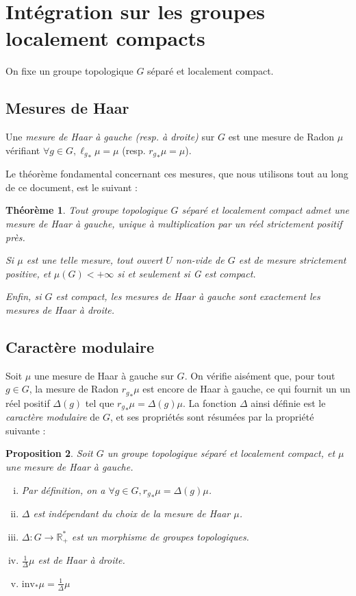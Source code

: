 \documentclass[a4paper,12pt]{article}
\newtheorem{theorem}{Théorème}[section]
\newtheorem{proposition}[theorem]{Proposition}
\newcommand{\R}{\mathbb{R}}
\newcommand{\ssi}{si et seulement si }
\newcommand{\invop}{\mathrm{inv}}
\begin{document}
\section{Intégration sur les groupes localement compacts}

On fixe un groupe topologique $G$ séparé et localement compact.

\subsection*{Mesures de Haar}

Une \emph{mesure de Haar à gauche (resp. à droite)} sur $G$
est une mesure de Radon $\mu$ vérifiant $\forall g\in G, {\ell_g}_*\mu = \mu$ (resp. ${r_g}_*\mu = \mu$).

Le théorème fondamental concernant ces mesures, que nous utilisons tout au long de ce document, est le suivant :
\begin{theorem}\label{theorem_Haar}
    Tout groupe topologique $G$ séparé et localement compact admet une mesure de Haar à gauche, unique à multiplication par un réel strictement 
    positif près. 
    
    Si $\mu$ est une telle mesure, tout ouvert $U$ non-vide de $G$ est de mesure strictement positive,
    et $\mu(G)<+\infty$ \ssi G est compact.

    Enfin, si $G$ est compact, les mesures de Haar à gauche sont exactement les mesures de Haar à droite.
\end{theorem}

\subsection*{Caractère modulaire}

Soit $\mu$ une mesure de Haar à gauche sur $G$. On vérifie aisément que, pour tout $g\in G$, la
mesure de Radon ${r_g}_*\mu$ est encore de Haar à gauche, ce qui fournit un un réel positif $\Delta(g)$ tel que 
${r_g}_*\mu = \Delta(g)\mu$. La fonction $\Delta$ ainsi définie est le \emph{caractère modulaire} de $G$,
et ses propriétés sont résumées par la propriété suivante :

\begin{proposition}\label{modular_character}
    Soit $G$ un groupe topologique séparé et localement compact, et $\mu$ une mesure de Haar à gauche.
    \begin{enumerate}[(i)]
        \item\label{modular_character/def} Par définition, on a $\forall g\in G, {r_g}_*\mu = \Delta(g)\mu$.
        \item\label{modular_character/indep} $\Delta$ est indépendant du choix de la mesure de Haar $\mu$.
        \item\label{modular_character/continuous_group_hom} $\Delta:G\to\R_+^*$ est un morphisme de groupes topologiques.
        \item\label{modular_character/right_haar} $\frac{1}{\Delta}\mu$ est de Haar à droite.
        \item\label{modular_character/inv_change_of_variable} $\invop_*\mu = \frac{1}{\Delta}\mu$
    \end{enumerate}
\end{proposition}
\end{document}
